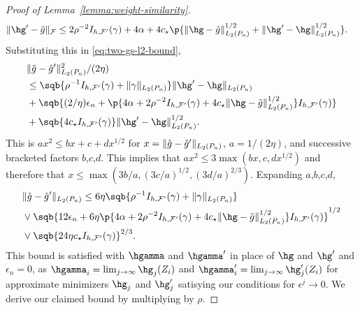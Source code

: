 \begin{proof}[Proof of Lemma~\ref{lemma:weight-similarity}]
\begin{align*}
\norm{\hg' - \tilde g}_{\F} 
&\le 2\rho^{-2} I_{h,\F'}(\gamma) + 4\alpha + 4 c_{\star} \p{\norm{\hg-\gapprox}_{L_2(\Pn)}^{1/2} + \norm{\hg'-\hg}_{L_2(\Pn)}^{1/2}}.
\end{align*}
Substituting this in \eqref{eq:two-gs-l2-bound},
\begin{align*}
&\norm{\hat g - \hat g'}_{L_2(\Pn)}^2/(2\eta) \\ 
&\le \sqb{\rho^{-1}I_{h,\F'}(\gamma) + \norm{\gamma}_{L_2(\Pn)}} \norm{\hg' - \hg}_{L_2(\Pn)} \\
&+ \sqb{(2/\eta)\epsilon_n + \p{4\alpha  + 2\rho^{-2}I_{h,\F'}(\gamma) 
      + 4c_{\star} \norm{\hg - \gapprox}_{L_2(\Pn)}^{1/2}} I_{h,\F'}(\gamma)} \\
&+ \sqb{4c_{\star} I_{h,\F'}(\gamma)} \norm{\hg'-\hg}_{L_2(\Pn)}^{1/2}.
\end{align*}
This is $ax^2 \le bx + c + dx^{1/2}$ for $x=\norm{\hat g - \hat g'}_{L_2(\Pn)}$, $a=1/(2\eta)$, and successive bracketed factors $b$,$c$,$d$.
This implies that $ax^2 \le 3\max(bx, c, dx^{1/2})$ and therefore that $x \le \max(3b/a, (3c/a)^{1/2}, (3d/a)^{2/3})$. 
Expanding $a$,$b$,$c$,$d$,
\begin{align*}
&\norm{\hat g - \hat g'}_{L_2(\Pn)} 
\le 6\eta\sqb{\rho^{-1}I_{h,\F'}(\gamma) + \norm{\gamma}_{L_2(\Pn)}} \\
&\vee   \sqb{12\epsilon_n + 6\eta\p{4\alpha  + 2\rho^{-2}I_{h,\F'}(\gamma) 
      + 4c_{\star} \norm{\hg - \gapprox}_{L_2(\Pn)}^{1/2}} I_{h,\F'}(\gamma) }^{1/2} \\
&\vee   \sqb{24 \eta c_{\star} I_{h,\F'}(\gamma)}^{2/3}. 
\end{align*}
This bound is satisfied with $\hgamma$ and $\hgamma'$ in place of $\hg$ and $\hg'$ and $\epsilon_n=0$, 
as $\hgamma_i=\lim_{j\to\infty}\hg_j(Z_i)$ and $\hgamma_i'=\lim_{j \to \infty}\hg_j'(Z_i)$
for approximate minimizers $\hg_j$ and $\hg_j'$ satisying our conditions for $\epsilon^j \to 0$. 
We derive our claimed bound by multiplying by $\rho$.
\end{proof}


